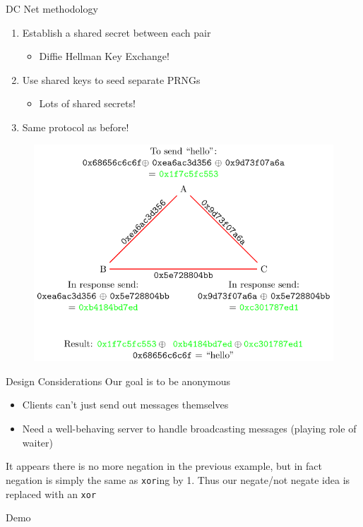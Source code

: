 \documentclass{beamer}
\begin{document}
\begin{frame}{DC Net methodology}
\begin{enumerate}[1.]
    \item Establish a shared secret between each pair 
    \begin{itemize}
        \item Diffie Hellman Key Exchange!
    \end{itemize}
    \item Use shared keys to seed separate PRNGs
    \begin{itemize}
        \item Lots of shared secrets! 
    \end{itemize}
    \item Same protocol as before!
\end{enumerate}

\begin{figure}
    \includegraphics[width=0.6\linewidth]{DCTriangleMessage.pdf}
\end{figure}
\end{frame}

\begin{frame}{Design Considerations}
Our goal is to be anonymous
\begin{itemize}
    \item Clients can't just send out messages themselves
    \item Need a well-behaving server to handle broadcasting messages (playing
    role of waiter)
\end{itemize}

It appears there is no more negation in the previous example, but in fact
negation is simply the same as \texttt{xor}ing by 1. Thus our negate/not negate
idea is replaced with an \texttt{xor}
\end{frame}

\begin{frame}
\begin{center}
    \Large Demo
\end{center}
\end{frame}
\end{document}
